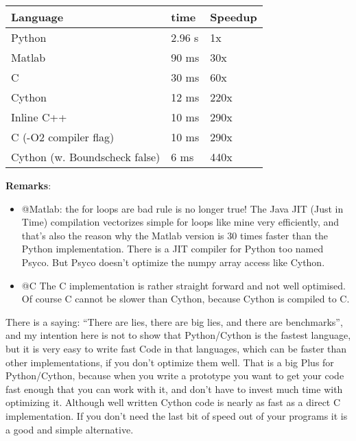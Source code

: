 \documentclass[letterpaper,10pt,english]{manual}
\begin{document}
\begin{tabulary}{\textwidth}{|L|L|L|}
\hline
\textbf{
Language
} & \textbf{
time
} & \textbf{
Speedup
}\\
\hline

Python
 & 
2.96 s
 & 
1x
\\

Matlab
 & 
90 ms
 & 
30x
\\

C
 & 
30 ms
 & 
60x
\\

Cython
 & 
12 ms
 & 
220x
\\

Inline C++
 & 
10 ms
 & 
290x
\\

C (-O2 compiler flag)
 & 
10 ms
 & 
290x
\\

Cython (w. Boundscheck false)
 & 
6 ms
 & 
440x
\\
\hline
\end{tabulary}


\textbf{Remarks}:
\begin{itemize}
\item {} 
@Matlab: the for loops are bad rule is no longer true! The
Java JIT (Just in Time) compilation vectorizes simple for loops like
mine very efficiently, and that's also the reason why the Matlab
version is 30 times faster than the Python implementation. There
is a JIT compiler for Python too named Psyco. But Psyco doesn't
optimize the numpy array access like Cython.

\item {} 
@C The C implementation is rather straight forward and not well
optimised. Of course C cannot be slower than Cython, because
Cython is compiled to C.

\end{itemize}

There is a saying: ``There are lies,
there are big lies, and there are benchmarks'', and my intention
here is not to show that Python/Cython is the fastest language,
but it is very easy to write fast Code in that languages, which can
be faster than other implementations, if you don't optimize them well.
That is a big Plus
for Python/Cython, because when you write a prototype you want to get
your
code fast enough that you can work with it, and don't have to invest
much time with optimizing it. Although well written Cython code is
nearly as fast as a direct C implementation. If you don't need the
last bit of speed out of your programs it is a good and simple
alternative.
\end{document}

